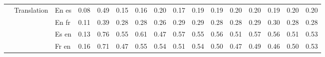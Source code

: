 \begin{center}
\begin{longtable}{lllrrrrrrrrrrrrr}
\cline{2-16}
 & \multirow[t]{4}{*}{Translation} & En es & 0.08 & 0.49 & 0.15 & 0.16 & 0.20 & 0.17 & 0.19 & 0.19 & 0.20 & 0.20 & 0.19 & 0.20 & 0.20 \\
 &  & En fr & 0.11 & 0.39 & 0.28 & 0.28 & 0.26 & 0.29 & 0.29 & 0.28 & 0.28 & 0.29 & 0.30 & 0.28 & 0.28 \\
 &  & Es en & 0.13 & 0.76 & 0.55 & 0.61 & 0.47 & 0.57 & 0.55 & 0.56 & 0.51 & 0.57 & 0.56 & 0.51 & 0.53 \\
 &  & Fr en & 0.16 & 0.71 & 0.47 & 0.55 & 0.54 & 0.51 & 0.54 & 0.50 & 0.47 & 0.49 & 0.46 & 0.50 & 0.53 \\
\cline{1-16} \cline{2-16}
\bottomrule
\end{longtable}

\end{center}
\twocolumn